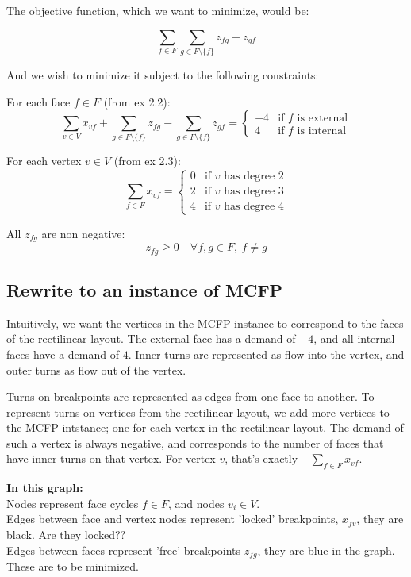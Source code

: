 The objective function, which we want to minimize, would be:

$$\sum_{f\in F} \sum_{g \in F \setminus{\{f\} }} {z_{fg} + z_{gf} }$$

And we wish to minimize it subject to the following constraints:

For each face $f \in F$ (from ex 2.2):
$$\sum_{v \in V}{x_{vf}} + \sum_{g \in F \setminus \{f\}}{z_{fg}} - \sum_{g \in F \setminus \{f\}}{z_{gf}} = \begin{cases} -4 & \text{if $f$ is external} \\ 4 & \text{if $f$ is internal}\end{cases}
$$

For each vertex $v \in V$ (from ex 2.3):
$$  \sum_{f \in F} {x_{vf}} = \begin{cases}
                                0 & \text{if $v$ has degree } 2 \\
                                2 & \text{if $v$ has degree } 3 \\
                                4 & \text{if $v$ has degree } 4
                              \end{cases}
$$

All $z_{fg}$ are non negative:
$$ z_{fg} \ge 0 \quad \forall f, g \in F, \:f\neq g $$

\subsection{Rewrite to an instance of MCFP}

Intuitively, we want the vertices in the MCFP instance to correspond to the faces of the rectilinear layout. The external face has a demand of $-4$, and all internal faces have a demand of $4$. Inner turns are represented as flow into the vertex, and outer turns as flow out of the vertex.

Turns on breakpoints are represented as edges from one face to another. To represent turns on vertices from the rectilinear layout, we add more vertices to the MCFP intstance; one for each vertex in the rectilinear layout. The demand of such a vertex is always negative, and corresponds to the number of faces that have inner turns on that vertex. For vertex $v$, that's exactly $-\sum_{f \in F}{x_{vf}}$.

\textbf{In this graph:} \\
Nodes represent face cycles $f \in F$, and nodes $v_i \in V$.\\
Edges between face and vertex nodes represent 'locked' breakpoints, $x_{fv}$, they are black. Are they locked??\\
Edges between faces represent 'free' breakpoints $z_{fg}$, they are blue in the graph. These are to be minimized.

